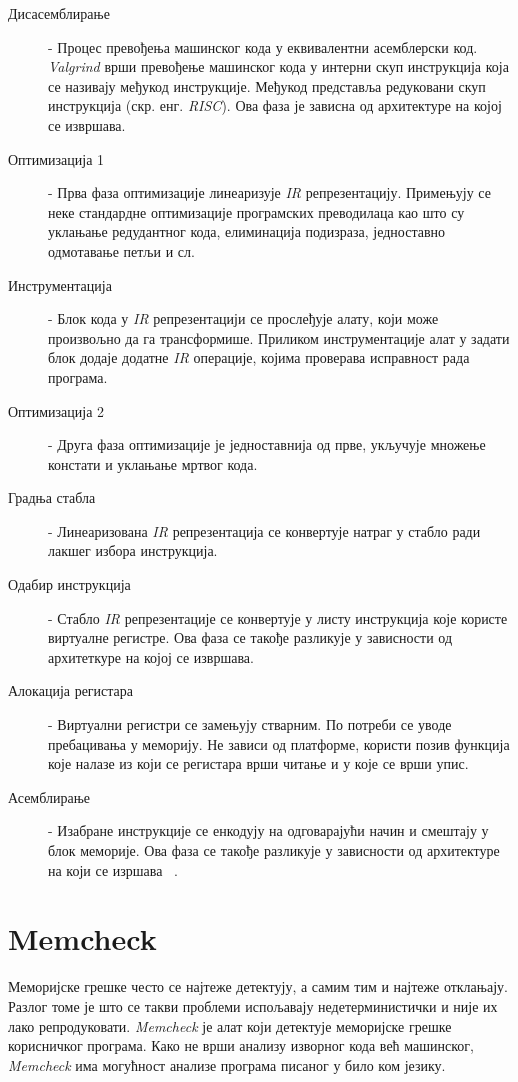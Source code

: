 \documentclass[12pt,oneside]{memoir}
\begin{document}
\begin{description}
	\item[Дисасемблирање] - Процес превођења машинског кода у еквивалентни асемблерски код. \textit{Valgrind} врши превођење машинског кода у интерни скуп инструкција која се називају међукод инструкције. Међукод представља редуковани скуп инструкција (скр. енг. \textit{RISC}). Ова фаза је зависна од архитектуре на којој се извршава.
	\item[Оптимизација 1] - Прва фаза оптимизације линеаризује \textit{IR} репрезентацију. Примењују се неке стандардне оптимизације програмских преводилаца као што су уклањање редудантног кода, елиминација подизраза, једноставно одмотавање петљи и сл.
	\item[Инструментација] - Блок кода у \textit{IR} репрезентацији се прослеђује алату, који може произвољно да га трансформише. Приликом инструментације алат у задати блок додаје додатне \textit{IR} операције, којима проверава исправност рада програма.
	\item[Оптимизација 2] - Друга фаза оптимизације је једноставнија од прве, укључује множење констати и уклањање мртвог кода.
	\item[Градња стабла] - Линеаризована \textit{IR} репрезентација се конвертује натраг у стабло ради лакшег избора инструкција.
	\item[Одабир инструкција] - Стабло \textit{IR} репрезентације се конвертује у листу инструкција које користе виртуалне регистре. Ова фаза се такође разликује у зависности од архитеткуре на којој се извршава.
	\item[Алокација регистара] - Виртуални регистри се замењују стварним. По потреби се уводе пребацивања у меморију. Не зависи од платформе, користи позив функција које налазе из који се регистара врши читање и у које се врши упис.
	\item[Асемблирање] - Изабране инструкције се енкодују на одговарајући начин и смештају у блок меморије. Ова фаза се такође разликује у зависности  од архитектуре на који се изршава ~\cite{SeeMIPSRun}.
\end{description}

\section{Memcheck}
\label{section_memcheck}

\indent Меморијске грешке често се најтеже детектују, а самим тим и најтеже отклањају. Разлог томе је што се такви проблеми испољавају недетерминистички и није их лако репродуковати. \textit{Memcheck} је алат који детектује меморијске грешке корисничког програма. Како не врши анализу изворног кода већ машинског, \textit{Memcheck} има могућност анализе програма писаног у било ком језику.
\end{document}
